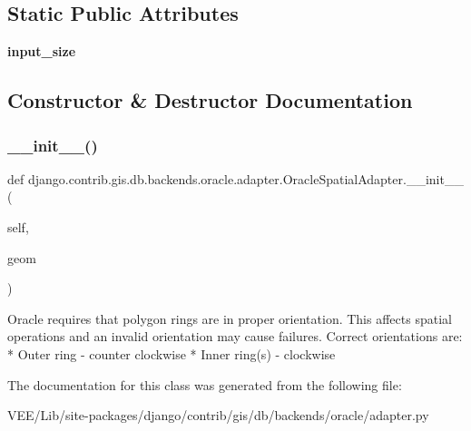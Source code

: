 \subsection*{Static Public Attributes}
\begin{DoxyCompactItemize}
\item 
\mbox{\label{classdjango_1_1contrib_1_1gis_1_1db_1_1backends_1_1oracle_1_1adapter_1_1_oracle_spatial_adapter_ab89b42a2edc97b81f78bd5dabf98eda3}} 
{\bfseries input\+\_\+size}
\end{DoxyCompactItemize}


\subsection{Constructor \& Destructor Documentation}
\mbox{\label{classdjango_1_1contrib_1_1gis_1_1db_1_1backends_1_1oracle_1_1adapter_1_1_oracle_spatial_adapter_afe965ce4ee912f9737be321721841053}} 
\subsubsection{\texorpdfstring{\+\_\+\+\_\+init\+\_\+\+\_\+()}{\_\_init\_\_()}}
{\footnotesize\ttfamily def django.\+contrib.\+gis.\+db.\+backends.\+oracle.\+adapter.\+Oracle\+Spatial\+Adapter.\+\_\+\+\_\+init\+\_\+\+\_\+ (\begin{DoxyParamCaption}\item[{}]{self,  }\item[{}]{geom }\end{DoxyParamCaption})}

\begin{DoxyVerb}Oracle requires that polygon rings are in proper orientation. This
affects spatial operations and an invalid orientation may cause
failures. Correct orientations are:
 * Outer ring - counter clockwise
 * Inner ring(s) - clockwise
\end{DoxyVerb}
 

The documentation for this class was generated from the following file\+:\begin{DoxyCompactItemize}
\item 
V\+E\+E/\+Lib/site-\/packages/django/contrib/gis/db/backends/oracle/adapter.\+py\end{DoxyCompactItemize}
